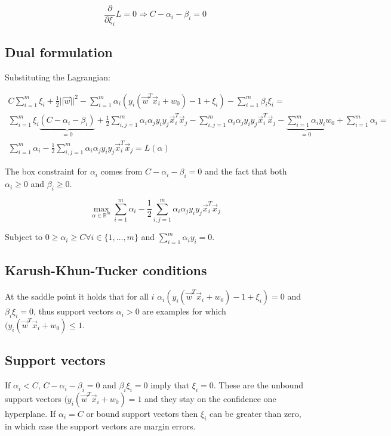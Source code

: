 	$$\frac{\partial}{\partial\xi_i}L = 0 \Rightarrow C - \alpha_i -\beta_i = 0$$

	\subsection{Dual formulation}
	Substituting the Lagrangian:

	\begin{align*}
		C\sum\limits_{i=1}^m\xi_i+\frac{1}{2}||\vec{w}||^2-\sum\limits_{i=1}^m\alpha_i(y_i(\vec{w}^T\vec{x}_i+w_0)-1+\xi_i) - \sum\limits_{i=1}^m\beta_i\xi_i=\\
		\sum\limits_{i=1}^m\xi_i\underbrace{(C-\alpha_i-\beta_i)}_{=0}+\frac{1}{2}\sum\limits_{i,j=1}^m\alpha_i\alpha_jy_iy_j\vec{x}_i^T\vec{x}_j-\sum\limits_{i,j=1}^m\alpha_i\alpha_jy_iy_j\vec{x}_i^T\vec{x}_j-\underbrace{\sum\limits_{i=1}^m\alpha_iy_i}_{=0}w_0+\sum\limits_{i=1}^m\alpha_i=\\
		\sum\limits_{i=1}^m\alpha_i-\frac{1}{2}\sum\limits_{i,j=1}^m\alpha_i\alpha_jy_iy_j\vec{x}^T_i\vec{x}_j= L(\alpha)
	\end{align*}

	The box constraint for $\alpha_i$ comes from $C-\alpha_i-\beta_i=0$ and the fact that both $\alpha_i\ge 0$ and $\beta_i\ge 0$.

	$$\max\limits_{\alpha\in\mathbb{R}^m}\sum\limits_{i=1}^m\alpha_i -\frac{1}{2}\sum\limits_{i,j=1}^m\alpha_i\alpha_jy_iy_j\vec{x}_i^T\vec{x}_j$$

	Subject to $0\ge \alpha_i\ge C \forall i\in\{1, \dots, m\}$ and $\sum\limits_{i=1}^m\alpha_iy_i=0$.

	\subsection{Karush-Khun-Tucker conditions}
	At the saddle point it holds that for all $i$ $\alpha_i(y_i(\vec{w}^T\vec{x}_i + w_0)-1+\xi_i)=0$ and $\beta_i\xi_i = 0$, thus support vectors $\alpha_i > 0$ are examples for which $(y_i(\vec{w}^T\vec{x}_i+w_0)\le 1$.

	\subsection{Support vectors}
	If $\alpha_i< C$, $C-\alpha_i-\beta_i=0$ and $\beta_i\xi_i=0$ imply that $\xi_i=0$.
	These are the unbound support vectors $(y_i(\vec{w}^T\vec{x}_i+w_0)=1$ and they stay on the confidence one hyperplane.
	If $\alpha_i=C$ or bound support vectors then $\xi_i$ can be greater than zero, in which case the support vectors are margin errors.

